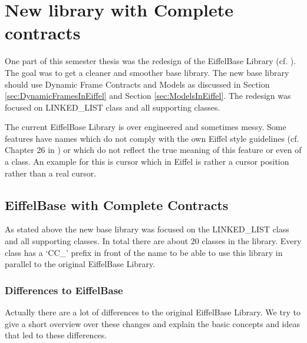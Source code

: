 \chapter{New library with Complete contracts}
\label{sec:LibraryDesign}

One part of this semester thesis was the redesign of the EiffelBase Library (cf. \cite{eiffelbase}). The goal was to get a cleaner and smoother base library. The new base library should use Dynamic Frame Contracts and Models as discussed in Section \ref{sec:DynamicFramesInEiffel} and Section \ref{sec:ModelsInEiffel}. The redesign was focused on LINKED\_LIST class and all supporting classes.

The current EiffelBase Library is over engineered and sometimes messy. Some features have names which do not comply with the own Eiffel style guidelines (cf. Chapter 26 in \cite{Meyer97Object}) or which do not reflect the true meaning of this feature or even of a class. An example for this is cursor which in Eiffel is rather a cursor position rather than a real cursor.

\section{EiffelBase with Complete Contracts}
\label{sec:EiffelBaseWithCompleteContracts}

As stated above the new base library was focused on the LINKED\_LIST class and all supporting classes. In total there are about 20 classes in the library. Every class has a `CC\_' prefix in front of the name to be able to use this library in parallel to the original EiffelBase Library.

\subsection{Differences to EiffelBase}
\label{sec:DifferencesToEiffelBase}

Actually there are a lot of differences to the original EiffelBase Library. We try to give a short overview over these changes and explain the basic concepts and ideas that led to these differences.

